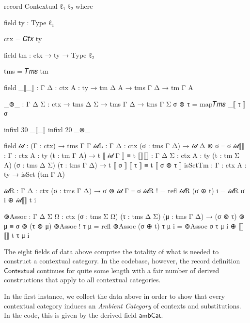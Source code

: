 \begin{AgdaMultiCode}
\begin{code}
record Contextual ℓ₁ ℓ₂ where

  field
    ty : Type ℓ₁

  ctx = 𝐶𝑡𝑥 ty

  field
    tm : ctx → ty → Type ℓ₂

  tms = 𝑇𝑚𝑠 tm

  field
    _⟦_⟧ : {Γ Δ : ctx} {A : ty} → tm Δ A → tms Γ Δ → tm Γ A

  _⊚_ : {Γ Δ Σ : ctx} → tms Δ Σ → tms Γ Δ → tms Γ Σ
  σ ⊚ τ = map𝑇𝑚𝑠 _⟦ τ ⟧ σ
\end{code}
\begin{code}[hide]
  infixl 30 _⟦_⟧
  infixl 20 _⊚_
\end{code}
\begin{code}

  field
    𝒾𝒹 : (Γ : ctx) → tms Γ Γ
    𝒾𝒹L : {Γ Δ : ctx} (σ : tms Γ Δ) → 𝒾𝒹 Δ ⊚ σ ≡ σ
    𝒾𝒹⟦⟧ : {Γ : ctx} {A : ty} (t : tm Γ A) → t ⟦ 𝒾𝒹 Γ ⟧ ≡ t
    ⟦⟧⟦⟧ : {Γ Δ Σ : ctx} {A : ty} (t : tm Σ A) (σ : tms Δ Σ) (τ : tms Γ Δ) →
      t ⟦ σ ⟧ ⟦ τ ⟧ ≡ t ⟦ σ ⊚ τ ⟧
    isSetTm : {Γ : ctx} {A : ty} → isSet (tm Γ A)

  𝒾𝒹R : {Γ Δ : ctx} (σ : tms Γ Δ) → σ ⊚ 𝒾𝒹 Γ ≡ σ
  𝒾𝒹R ! = refl
  𝒾𝒹R (σ ⊕ t) i = 𝒾𝒹R σ i ⊕ 𝒾𝒹⟦⟧ t i

  ⊚Assoc : {Γ Δ Σ Ω : ctx} (σ : tms Σ Ω) (τ : tms Δ Σ) (μ : tms Γ Δ) →
    (σ ⊚ τ) ⊚ μ ≡ σ ⊚ (τ ⊚ μ)
  ⊚Assoc ! τ μ = refl
  ⊚Assoc (σ ⊕ t) τ μ i = ⊚Assoc σ τ μ i ⊕ ⟦⟧⟦⟧ t τ μ i
\end{code}
\end{AgdaMultiCode}

The eight fields of data above comprise the totality of what is needed to
construct a contextual category. In the codebase, however, the record definition
$\mathsf{Contextual}$ continues for quite some length with a fair number of
derived constructions that apply to all contextual categories.

In the first instance, we collect the data above in order to show that every
contextual category induces an \emph{Ambient Category} of contexts and
substitutions. In the code, this is given by the derived field
$\mathsf{ambCat}$.


